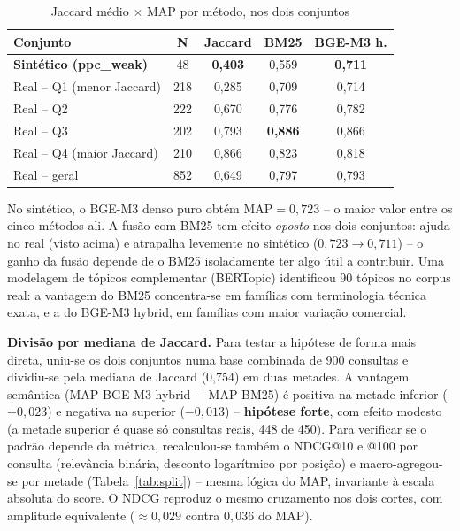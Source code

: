 \documentclass[12pt]{article}
\begin{document}
\begin{table}[ht]
\centering
\small
\caption{Jaccard m\'edio $\times$ MAP por m\'etodo, nos dois conjuntos}
\label{tab:jaccard}
\begin{tabular}{|l|c|c|c|c|}
\hline
\textbf{Conjunto} & \textbf{N} & \textbf{Jaccard} & \textbf{BM25} & \textbf{BGE-M3 h.} \\
\hline
\textbf{Sint\'etico (ppc\_weak)} & 48 & \textbf{0,403} & 0,559 & \textbf{0,711} \\
\hline
Real -- Q1 (menor Jaccard) & 218 & 0,285 & 0,709 & 0,714 \\
\hline
Real -- Q2 & 222 & 0,670 & 0,776 & 0,782 \\
\hline
Real -- Q3 & 202 & 0,793 & \textbf{0,886} & 0,866 \\
\hline
Real -- Q4 (maior Jaccard) & 210 & 0,866 & 0,823 & 0,818 \\
\hline
Real -- geral & 852 & 0,649 & 0,797 & 0,793 \\
\hline
\end{tabular}
\end{table}

No sint\'etico, o BGE-M3 denso puro obt\'em MAP$=0{,}723$ -- o maior valor entre os cinco m\'etodos ali. A fus\~ao com BM25 tem efeito \emph{oposto} nos dois conjuntos: ajuda no real (visto acima) e atrapalha levemente no sint\'etico ($0{,}723\rightarrow0{,}711$) -- o ganho da fus\~ao depende de o BM25 isoladamente ter algo \'util a contribuir. Uma modelagem de t\'opicos complementar (BERTopic) identificou 90 t\'opicos no corpus real: a vantagem do BM25 concentra-se em fam\'ilias com terminologia t\'ecnica exata, e a do BGE-M3 hybrid, em fam\'ilias com maior varia\c{c}\~ao comercial.

\textbf{Divis\~ao por mediana de Jaccard.} Para testar a hip\'otese de forma mais direta, uniu-se os dois conjuntos numa base combinada de 900 consultas e dividiu-se pela mediana de Jaccard (0,754) em duas metades. A vantagem sem\^antica (MAP BGE-M3 hybrid $-$ MAP BM25) \'e positiva na metade inferior ($+0{,}023$) e negativa na superior ($-0{,}013$) -- \textbf{hip\'otese forte}, com efeito modesto (a metade superior \'e quase s\'o consultas reais, 448 de 450). Para verificar se o padr\~ao depende da m\'etrica, recalculou-se tamb\'em o NDCG@10 e @100 por consulta (relev\^ancia bin\'aria, desconto logar\'itmico por posi\c{c}\~ao) e macro-agregou-se por metade (Tabela~\ref{tab:split}) -- mesma l\'ogica do MAP, invariante \`a escala absoluta do score. O NDCG reproduz o mesmo cruzamento nos dois cortes, com amplitude equivalente ($\approx0{,}029$ contra $0{,}036$ do MAP).
\end{document}
